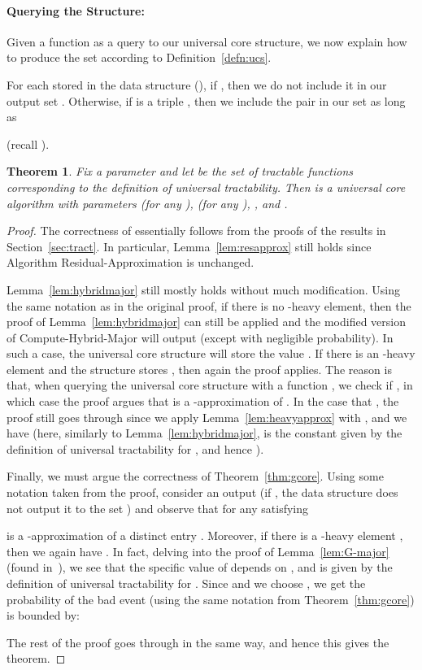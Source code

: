 \documentclass[11pt]{article}
\newtheorem{thm}{Theorem}
\begin{document}
\paragraph{Querying the Structure:} Given a function  as a query to our universal
core structure, we now explain how to produce the set  according to Definition~\ref{defn:ucs}.

For each stored  in the data structure  (), if , then
we do not include it in our output set .  Otherwise, if  is a triple ,
then we include the pair  in our set  as long as

(recall ).


\begin{thm}\label{thm:ucore}
Fix a parameter  and let  be the set of tractable functions corresponding to the
definition of universal tractability.  Then  is a universal core algorithm with parameters
 (for any ), 
(for any ), , and .
\end{thm}

\begin{proof}
The correctness of  essentially follows from the proofs of the results in Section~\ref{sec:tract}.
In particular, Lemma~\ref{lem:resapprox} still holds since Algorithm Residual-Approximation is unchanged.

Lemma~\ref{lem:hybridmajor} still mostly holds without much modification.  Using the same notation
as in the original proof, if there
is no -heavy element, then the proof of Lemma~\ref{lem:hybridmajor} can still be applied
and the modified version of Compute-Hybrid-Major will output 
(except with negligible probability).  In such a case, the universal core structure will store the value .
If there is an -heavy element  and the structure stores , then again the
proof applies.  The reason is that, when
querying the universal core structure with a function , we check if
,
in which case the proof argues that  is a -approximation of .  In
the case that , the proof still goes through
since we apply Lemma~\ref{lem:heavyapprox} with , and we have
 (here, similarly to Lemma~\ref{lem:hybridmajor},  is the constant given by
the definition of universal tractability for , and hence ).

Finally, we must argue the correctness of Theorem~\ref{thm:gcore}.  Using some notation taken
from the proof, consider an output  (if , the data structure does not output it
to the set ) and observe that  for any  satisfying

is a -approximation of a distinct entry .  Moreover,
if there is a -heavy element , then we again have
.  In
fact, delving into the proof of Lemma~\ref{lem:G-major} (found in~\cite{BO10}), we see that the
specific value of  depends on , and is given by the definition of universal tractability for .
Since  and we choose , we get the probability of the bad
event  (using the same notation from Theorem~\ref{thm:gcore}) is bounded by:

The rest of the proof goes through in the same way, and hence this gives the theorem.
\end{proof}
\end{document}

